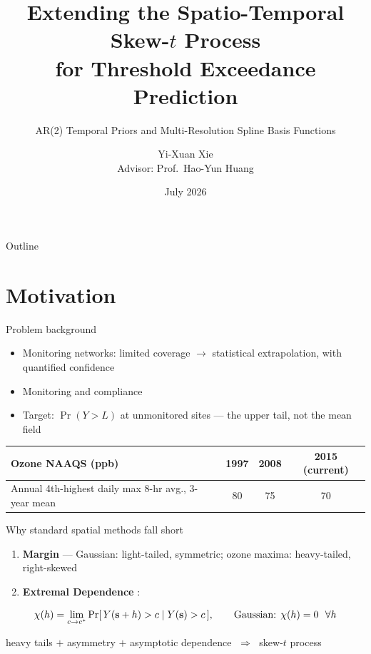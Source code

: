 \documentclass[12pt, aspectratio=169]{beamer}
\title[STP extensions for exceedance prediction]{Extending the Spatio-Temporal Skew-$t$ Process\\ for Threshold Exceedance Prediction}
\subtitle{AR(2) Temporal Priors and Multi-Resolution Spline Basis Functions}
\author[Y.-X.\ Xie]{Yi-Xuan Xie\\[0.4em] {\small Advisor: Prof.\ Hao-Yun Huang}}
\institute[NDHU]{Department of Applied Mathematics\\ National Dong Hwa University}
\date{July 2026}
\begin{document}

{
\begin{frame}[plain]
  \titlepage
\end{frame}}

\begin{frame}{Outline}
  \tableofcontents
\end{frame}

\section{Motivation}

\begin{frame}{Problem background}
  \begin{itemize}
    \item Monitoring networks: limited coverage $\to$ statistical
          extrapolation, with quantified confidence
    \item Monitoring and compliance
    \item Target: $\Pr(Y > L)$ at \alert{unmonitored} sites ---
          the upper tail, not the mean field
  \end{itemize}
  \bigskip
  \begin{center}
    \begin{tabular}{@{}lccc@{}}
      \toprule
      Ozone NAAQS (ppb) & 1997 & 2008 & 2015 (current) \\
      \midrule
      Annual 4th-highest daily max 8-hr avg., 3-year mean & 80 & 75 & 70 \\
      \bottomrule
    \end{tabular}
  \end{center}
\end{frame}

\begin{frame}{Why standard spatial methods fall short}
  \begin{enumerate}
    \item \textbf{Margin} --- Gaussian: light-tailed, symmetric;
          ozone maxima: \alert{heavy-tailed, right-skewed}
    \item \textbf{Extremal Dependence} \parencite{Coles1999}:
  \end{enumerate}
  \begin{equation*}
    \chi(h) = \lim_{c \to c^*} \Pr[\,Y(\mbox{\bf s} + h) > c \mid Y(\mbox{\bf s}) > c\,],
    \qquad \text{Gaussian: } \chi(h) = 0 \ \ \forall h
  \end{equation*}
  \bigskip
  \begin{center}
    heavy tails $+$ asymmetry $+$ asymptotic dependence
    $\;\Rightarrow\;$ \alert{skew-$t$ process}
  \end{center}
\end{frame}
\end{document}
